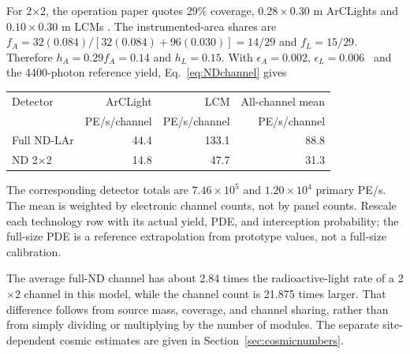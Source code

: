 For 2$\times$2, the operation paper quotes 29\% coverage,
$0.28\times0.30$ m ArCLights and $0.10\times0.30$ m LCMs
\cite{nd_operation}. The instrumented-area shares are
$f_A=32(0.084)/[32(0.084)+96(0.030)]=14/29$ and $f_L=15/29$.
Therefore $h_A=0.29f_A=0.14$ and $h_L=0.15$.
With $\epsilon_A=0.002$, $\epsilon_L=0.006$~\cite{nd_status} and the
4400-photon reference yield, Eq.~\eqref{eq:NDchannel} gives
\begin{center}
\begin{tabular}{lrrr}
\toprule
Detector & ArCLight & LCM & All-channel mean \\
 & PE/s/channel & PE/s/channel & PE/s/channel \\
\midrule
Full ND-LAr & 44.4 & 133.1 & 88.8 \\
ND 2$\times$2 & 14.8 & 47.7 & 31.3 \\
\bottomrule
\end{tabular}
\end{center}
The corresponding detector totals are $7.46\times10^5$ and
$1.20\times10^4$ primary PE/s. The mean is weighted by electronic
channel counts, not by panel counts. Rescale each technology row with its
actual yield, PDE, and interception probability; the full-size PDE is a
reference extrapolation from prototype values, not a full-size calibration.

The average full-ND channel has about 2.84 times the radioactive-light rate
of a 2$\times$2 channel in this model, while the channel count is 21.875
 times larger. That difference follows from source mass, coverage, and
channel sharing, rather than from simply dividing or multiplying by the
number of modules. The separate site-dependent cosmic estimates are
 given in Section~\ref{sec:cosmicnumbers}.
